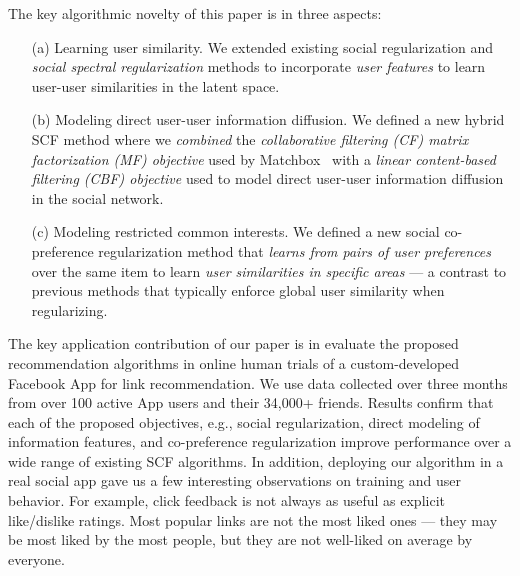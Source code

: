 The key algorithmic novelty of this paper is in three aspects:
\begin{itemize}
\item[(a)] Learning user similarity.
We extended existing social regularization and \emph{social spectral regularization} methods to incorporate \emph{user features} to learn user-user similarities in the latent space.
\item[(b)] Modeling direct user-user information diffusion. 
We defined a new hybrid SCF method where we \emph{combined} the \emph{collaborative filtering (CF) matrix factorization (MF) objective} used by Matchbox~\cite{matchbox} with a \emph{linear content-based filtering (CBF) objective} used to model direct user-user information diffusion in the social network.
\item[(c)] Modeling restricted common interests.
We defined a new social co-preference regularization method that \emph{learns from pairs of user preferences} over the same item to learn \emph{user similarities in specific areas} --- a contrast to previous methods that typically enforce global user similarity when regularizing.
\end{itemize}

The key application contribution of our paper is in
evaluate the proposed recommendation algorithms in online human
trials of a custom-developed Facebook App for link recommendation.
We use data collected over three months from over 100 active App
users and their 34,000+ friends. Results confirm that each of 
the proposed objectives, e.g., social regularization, direct modeling of information
features, and co-preference regularization improve performance over 
a wide range of existing SCF algorithms. 
In addition, deploying our algorithm in a real social app gave us a few interesting 
observations on training and user behavior. For example, click feedback is not always as useful as explicit like/dislike
ratings.%
 Most popular links are not the most liked ones --- they may be most
liked by the most people, but they are not well-liked on average by everyone.


